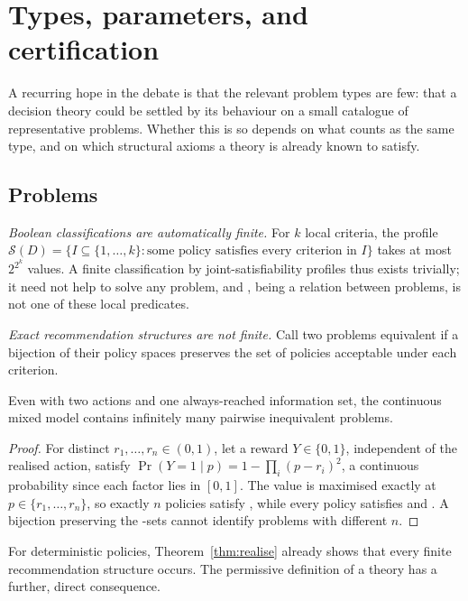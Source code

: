 \section{Types, parameters, and certification}\label{sec:taxonomy}

A recurring hope in the debate is that the relevant problem types are few: that a decision theory
could be settled by its behaviour on a small catalogue of representative problems. Whether this is
so depends on what counts as the same type, and on which structural axioms a theory is already
known to satisfy.

\subsection{Problems}

\emph{Boolean classifications are automatically finite.} For $k$ local criteria, the profile
$\mathcal S(D)=\{I\subseteq\{1,\dots,k\}:\text{some policy satisfies every criterion in }I\}$ takes at most
$2^{2^k}$ values. A finite classification by joint-satisfiability profiles thus exists trivially; it
need not help to solve any problem, and , being a relation between problems, is not one of
these local predicates.

\emph{Exact recommendation structures are not finite.} Call two problems equivalent if a bijection of
their policy spaces preserves the set of policies acceptable under each criterion.

\begin{proposition}\label{prop:infinitetypes}
Even with two actions and one always-reached information set, the continuous mixed model contains
infinitely many pairwise inequivalent problems.
\end{proposition}

\begin{proof}
For distinct $r_1,\dots,r_n\in(0,1)$, let a reward $Y\in\{0,1\}$, independent of the realised action,
satisfy $\Pr(Y=1\mid p)=1-\prod_i(p-r_i)^2$, a continuous probability since each factor lies in $[0,1]$.
The value is maximised exactly at $p\in\{r_1,\dots,r_n\}$, so exactly $n$ policies satisfy , while
every policy satisfies  and . A bijection preserving the -sets cannot identify
problems with different $n$.
\end{proof}

For deterministic policies, Theorem~\ref{thm:realise} already shows that every finite recommendation
structure occurs. The permissive definition of a theory has a further, direct consequence.

